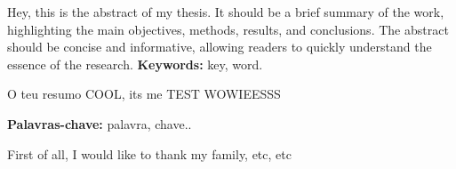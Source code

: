 


Hey, this is the abstract of my thesis. It should be a brief summary of the work, highlighting the main objectives, methods, results, and conclusions. The abstract should be concise and informative, allowing readers to quickly understand the essence of the research.
\textbf{Keywords:} key, word.


O teu resumo COOL, its me TEST WOWIEESSS

\textbf{Palavras-chave:} palavra, chave..



First of all, I would like to thank my family, etc, etc